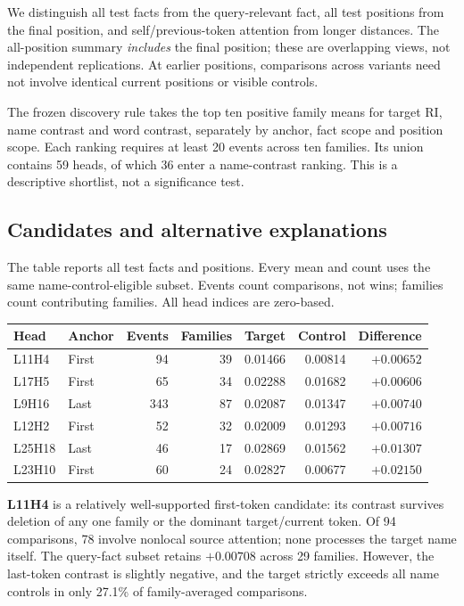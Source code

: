 \documentclass[11pt,a4paper]{article}
\begin{document}
We distinguish all test facts from the query-relevant fact, all test positions from the final position, and self/previous-token attention from longer distances. The all-position summary \emph{includes} the final position; these are overlapping views, not independent replications. At earlier positions, comparisons across variants need not involve identical current positions or visible controls.

The frozen discovery rule takes the top ten positive family means for target RI, name contrast and word contrast, separately by anchor, fact scope and position scope. Each ranking requires at least 20 events across ten families. Its union contains 59 heads, of which 36 enter a name-contrast ranking. This is a descriptive shortlist, not a significance test.

\subsection{Candidates and alternative explanations}
The table reports all test facts and positions. Every mean and count uses the same name-control-eligible subset. Events count comparisons, not wins; families count contributing families. All head indices are zero-based.

\begin{center}
\small
\begin{tabular}{llrrrrr}
\toprule
Head & Anchor & Events & Families & Target & Control & Difference \\
\midrule
L11H4  & First & 94  & 39 & 0.01466 & 0.00814 & $+0.00652$ \\
L17H5  & First & 65  & 34 & 0.02288 & 0.01682 & $+0.00606$ \\
L9H16  & Last  & 343 & 87 & 0.02087 & 0.01347 & $+0.00740$ \\
L12H2  & First & 52  & 32 & 0.02009 & 0.01293 & $+0.00716$ \\
L25H18 & Last  & 46  & 17 & 0.02869 & 0.01562 & $+0.01307$ \\
L23H10 & First & 60  & 24 & 0.02827 & 0.00677 & $+0.02150$ \\
\bottomrule
\end{tabular}
\end{center}

\textbf{L11H4} is a relatively well-supported first-token candidate: its contrast survives deletion of any one family or the dominant target/current token. Of 94 comparisons, 78 involve nonlocal source attention; none processes the target name itself. The query-fact subset retains $+0.00708$ across 29 families. However, the last-token contrast is slightly negative, and the target strictly exceeds all name controls in only 27.1\% of family-averaged comparisons.
\end{document}

